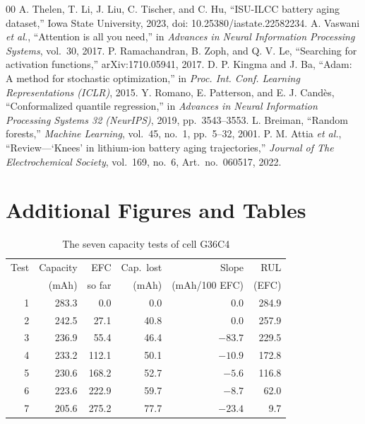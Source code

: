 \documentclass[conference]{IEEEtran}
\begin{document}
\begin{thebibliography}{00}
 A. Thelen, T. Li, J. Liu, C. Tischer, and C. Hu, ``ISU-ILCC battery aging dataset,'' Iowa State University, 2023, doi: 10.25380/iastate.22582234.
 A. Vaswani \emph{et al.}, ``Attention is all you need,'' in \emph{Advances in Neural Information Processing Systems}, vol.~30, 2017.
 P. Ramachandran, B. Zoph, and Q. V. Le, ``Searching for activation functions,'' arXiv:1710.05941, 2017.
 D. P. Kingma and J. Ba, ``Adam: A method for stochastic optimization,'' in \emph{Proc. Int. Conf. Learning Representations (ICLR)}, 2015.
 Y. Romano, E. Patterson, and E. J. Cand\`es, ``Conformalized quantile regression,'' in \emph{Advances in Neural Information Processing Systems 32 (NeurIPS)}, 2019, pp.~3543--3553.
 L. Breiman, ``Random forests,'' \emph{Machine Learning}, vol.~45, no.~1, pp.~5--32, 2001.
 P. M. Attia \emph{et al.}, ``Review---`Knees' in lithium-ion battery aging trajectories,'' \emph{Journal of The Electrochemical Society}, vol.~169, no.~6, Art.~no.~060517, 2022.
\end{thebibliography}

\clearpage
\onecolumn
\appendices
\section{Additional Figures and Tables}

\begin{table}[h]
\centering
\caption{The seven capacity tests of cell G36C4}
\label{tab:example}
\footnotesize
\setlength{\tabcolsep}{4pt}
\begin{tabular}{@{}rrrrrr@{}}
\toprule
Test & Capacity & EFC & Cap.\ lost & Slope & RUL \\
 & (mAh) & so far & (mAh) & (mAh/100 EFC) & (EFC) \\
\midrule
1 & 283.3 & 0.0 & 0.0 & 0.0 & 284.9 \\
2 & 242.5 & 27.1 & 40.8 & 0.0 & 257.9 \\
3 & 236.9 & 55.4 & 46.4 & $-83.7$ & 229.5 \\
4 & 233.2 & 112.1 & 50.1 & $-10.9$ & 172.8 \\
5 & 230.6 & 168.2 & 52.7 & $-5.6$ & 116.8 \\
6 & 223.6 & 222.9 & 59.7 & $-8.7$ & 62.0 \\
7 & 205.6 & 275.2 & 77.7 & $-23.4$ & 9.7 \\
\bottomrule
\end{tabular}
\end{table}
\end{document}
